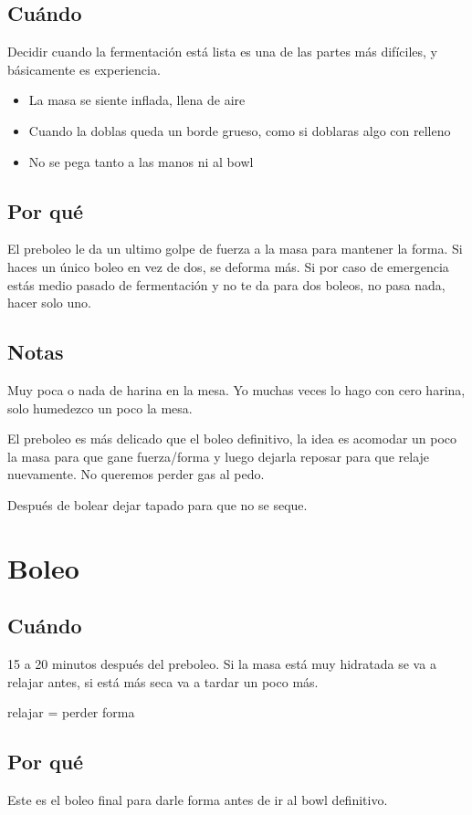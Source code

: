 \documentclass[10pt,a4paper]{article}
\begin{document}
\subsection*{Cuándo}
Decidir cuando la fermentación está lista es una de las partes más difíciles, y
básicamente es experiencia.

\begin{itemize}
  \item La masa se siente inflada, llena de aire
  \item Cuando la doblas queda un borde grueso, como si doblaras algo con relleno
  \item No se pega tanto a las manos ni al bowl
\end{itemize}
\subsection*{Por qué}
El preboleo le da un ultimo golpe de fuerza a la masa para mantener la forma. Si
haces un único boleo en vez de dos, se deforma más. Si por caso de emergencia
estás medio pasado de fermentación y no te da para dos boleos, no pasa nada,
hacer solo uno.

\subsection*{Notas}
Muy poca o nada de harina en la mesa. Yo muchas veces lo hago con cero harina,
solo humedezco un poco la mesa.

El preboleo es más delicado que el boleo definitivo, la idea es acomodar un poco
la masa para que gane fuerza/forma y luego dejarla reposar para que relaje
nuevamente. No queremos perder gas al pedo.

Después de bolear dejar tapado para que no se seque.

\section{Boleo}
\subsection*{Cuándo}
15 a 20 minutos después del preboleo. Si la masa está muy hidratada se va a
relajar antes, si está más seca va a tardar un poco más.

relajar = perder forma
\subsection*{Por qué}
Este es el boleo final para darle forma antes de ir al bowl definitivo.
\end{document}
